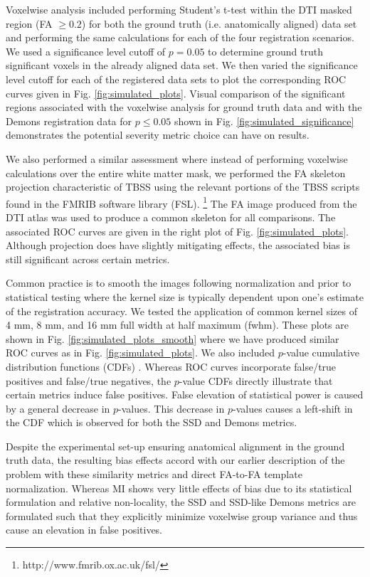 \documentclass[final,5p,times,twocolumn]{elsarticle}
\begin{document}
Voxelwise analysis included performing Student's t-test within the
DTI masked region (FA $\geq 0.2$) for both the ground truth (i.e.
anatomically aligned) data set and performing the same calculations
for each of the four registration scenarios.  We used a significance
level cutoff of $p = 0.05$ to determine ground truth significant
voxels in the already aligned data set.  We then varied the 
significance level cutoff for each of the registered data sets to plot
the corresponding ROC curves given in Fig. \ref{fig:simulated_plots}.
Visual comparison of the significant regions associated with the 
voxelwise analysis for ground truth data and with the Demons registration data for
$p \leq 0.05$ shown in Fig. \ref{fig:simulated_significance} demonstrates 
the potential severity metric choice can have on results.

We also performed a similar assessment
where instead of performing voxelwise calculations over the entire
white matter mask, we performed the FA skeleton projection characteristic
of TBSS using the relevant portions of the TBSS scripts found in the 
FMRIB software library (FSL).%
\footnote{
http://www.fmrib.ox.ac.uk/fsl/
}
The FA 
image produced from the
DTI atlas was used to produce a common skeleton for all comparisons.
The associated ROC curves are given
in the right plot of Fig. \ref{fig:simulated_plots}.  Although projection
does have slightly mitigating effects, the associated bias is still 
significant across certain metrics.  

Common practice is to smooth the images following normalization and
prior to statistical testing where the kernel size is typically dependent upon
one's estimate of the registration accuracy.  We tested the application
of common kernel sizes of 4 mm, 8 mm, and 16 mm full width at half
maximum (fwhm).  These plots are shown in Fig. \ref{fig:simulated_plots_smooth}
where we have produced similar ROC curves as in Fig. \ref{fig:simulated_plots}.
We also included $p$-value cumulative distribution functions (CDFs) \cite{yanovsky2009}.
Whereas ROC curves incorporate false/true positives and false/true
negatives, the $p$-value CDFs directly illustrate that certain metrics 
induce false positives.  False elevation of statistical power is caused
by a general decrease in $p$-values.  This decrease in $p$-values causes
a left-shift in the CDF which is observed for both the SSD and Demons metrics.

Despite the experimental set-up ensuring anatomical alignment in the
ground truth data, the resulting bias effects accord with our earlier 
description of the problem with these similarity metrics and direct
FA-to-FA template normalization.  
Whereas MI shows very little effects of bias due to its statistical
formulation and relative non-locality, the SSD and SSD-like Demons
metrics are formulated such that they explicitly minimize voxelwise
group variance and thus cause an elevation in false positives.
\end{document}
